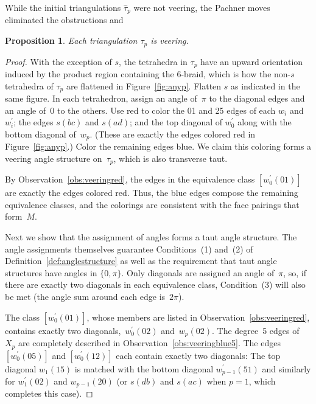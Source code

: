\documentclass[reqno]{amsart}
\theoremstyle{plain}
\newtheorem{prop}[thm]{Proposition}
\theoremstyle{definition}
\begin{document}
While the initial triangulations $\hat{\tau}_p$ were not veering, the Pachner moves eliminated the obstructions and 
\begin{prop}\label{prop:veering}
Each triangulation $\tau_{p}$ is veering.
\end{prop}
\begin{proof}
With the exception of $s$, the tetrahedra in $\tau_{p}$ have an upward orientation induced by the product region containing the 6-braid, which is how the non-$s$ tetrahedra of $\tau_{p}$ are flattened in Figure~\ref{fig:anyp}.   Flatten $s$ as indicated in the same figure.  In each tetrahedron, assign an angle of~$\pi$ to the diagonal edges and an angle of~0 to the others.  Use red to color the 01 and 25 edges of each $w_i$ and~$w_i^\prime$; the edges $s(bc)$ and $s(ad)$; and the top diagonal of $w_0^\prime$ along with the bottom diagonal of~$w_p$.  (These are exactly the edges colored red in Figure~\ref{fig:anyp}.)  Color the remaining edges blue.  We claim this coloring forms a veering angle structure on~$\tau_{p}$, which is also transverse taut.  

By Observation~\ref{obs:veeringred}, the edges in the equivalence class $[w_0^\prime(01)]$ are exactly the edges colored red.  Thus, the blue edges compose the remaining equivalence classes, and the colorings are consistent with the face pairings that form~$M$. 

Next we show that the assignment of angles forms a taut angle structure.  The angle assignments themselves guarantee  Conditions~(1) and~(2) of  Definition~\ref{def:anglestructure} as well as the requirement that taut angle structures have angles in $\{0,\pi\}$.  Only diagonals are assigned an angle of~$\pi$, so, if there are exactly two diagonals in each equivalence class, Condition~(3) will also be met (the angle sum around each edge is~$2\pi$).  

The class $[w_0^\prime(01)]$, whose members are listed in Observation~\ref{obs:veeringred}, contains exactly two diagonals,~$w_0^\prime(02)$ and~$w_p(02)$.  The degree~5 edges of $X_{p}$ are completely described in Observation~\ref{obs:veeringblue5}.  The edges $[w_0^\prime(05)]$ and $[w_0^\prime(12)]$ each contain exactly two diagonals:  The top diagonal $w_1(15)$ is matched with the bottom diagonal $w_{p-1}^\prime(51)$  and similarly for $w_1^\prime(02)$ and $w_{p-1}(20)$ (or $s(db)$ and $s(ac)$ when $p=1$, which completes this case). 


\end{proof}
\end{document}
